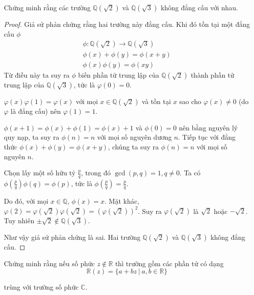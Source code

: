 \begin{exercise}Chứng minh rằng các trường $\mathbb{Q}(\sqrt{2})$ và $\mathbb{Q}(\sqrt{3})$ không đẳng cấu với nhau.
\end{exercise}

\begin{proof}Giả sử phản chứng rằng hai trường này đẳng cấu. Khi đó tồn tại một đẳng cấu $\phi$
    \begin{gather*}
        \phi: \mathbb{Q}(\sqrt{2})\rightarrow \mathbb{Q}(\sqrt{3}) \\
        \phi(x) + \phi(y) = \phi(x + y) \\
        \phi(x)\phi(y) = \phi(xy)
    \end{gather*}
    Từ điều này ta suy ra $\phi$ biến phần tử trung lập của $\mathbb{Q}(\sqrt{2})$ thành phần tử trung lập của $\mathbb{Q}(\sqrt{3})$, tức là $\varphi(0) = 0$.

    $\varphi(x)\varphi(1) = \varphi(x)$ với mọi $x\in\mathbb{Q}(\sqrt{2})$ và tồn tại $x$ sao cho $\varphi(x)\ne 0$ (do $\varphi$ là đẳng cấu) nên $\varphi(1) = 1$.
    
    $\phi(x + 1) = \phi(x) + \phi(1) = \phi(x) + 1$ và $\phi(0) = 0$ nên bằng nguyên lý quy nạp, ta suy ra $\phi(n) = n$ với mọi số nguyên dương $n$. Tiếp tục với đẳng thức $\phi(x) + \phi(y) = \phi(x + y)$, chúng ta suy ra $\phi(n) = n$ với mọi số nguyên $n$.

    Chọn lấy một số hữu tỷ $\frac{p}{q}$, trong đó $\operatorname{gcd}(p, q) = 1, q\ne 0$. Ta có $\phi\left(\frac{p}{q}\right)\phi(q) = \phi(p)$, tức là $\phi(\frac{p}{q}) = \frac{p}{q}$.
    
    Do đó, với mọi $x\in\mathbb{Q}$, $\phi(x) = x$. Mặt khác, $\varphi(2) = \varphi(\sqrt{2})\varphi(\sqrt{2}) = {(\varphi(\sqrt{2}))}^{2}$. Suy ra $\varphi(\sqrt{2})$ là $\sqrt{2}$ hoặc $-\sqrt{2}$. Tuy nhiên $\pm\sqrt{2}\notin \mathbb{Q}(\sqrt{3})$.

    Như vậy giả sử phản chứng là sai. Hai trường $\mathbb{Q}(\sqrt{2})$ và $\mathbb{Q}(\sqrt{3})$ không đẳng cấu.
\end{proof}

\begin{exercise}Chứng minh rằng nếu số phức $z\not\in\mathbb{R}$ thì trường gồm các phần tử có dạng
    \[ \mathbb{R}(z) = \{ a + bz\ |\ a, b\in\mathbb{R} \} \]
    \par trùng với trường số phức $\mathbb{C}$.
\end{exercise}

